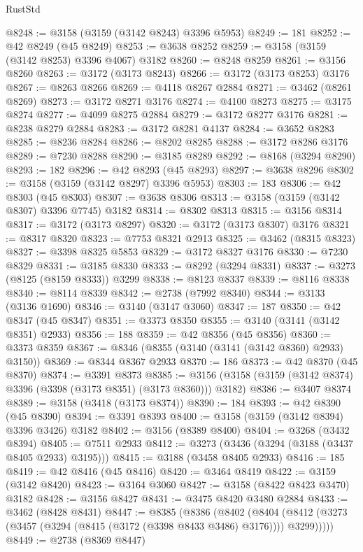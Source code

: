 \begin{lexlean}{RustStd}
\begin{coremodule}
@8248 := @3158 (@3159 (@3142 @8243) @3396 @5953)
@8249 := 181
@8252 := @42 @8249 (@45 @8249)
@8253 := @3638 @8252
@8259 := @3158 (@3159 (@3142 @8253) @3396 @4067) @3182
@8260 := @8248 @8259
@8261 := @3156 @8260
@8263 := @3172 (@3173 @8243)
@8266 := @3172 (@3173 @8253) @3176
@8267 := @8263 @8266
@8269 := @4118 @8267 @2884
@8271 := @3462 (@8261 @8269)
@8273 := @3172 @8271 @3176
@8274 := @4100 @8273
@8275 := @3175 @8274
@8277 := @4099 @8275 @2884
@8279 := @3172 @8277 @3176
@8281 := @8238 @8279 @2884
@8283 := @3172 @8281 @4137
@8284 := @3652 @8283
@8285 := @8236 @8284
@8286 := @8202 @8285
@8288 := @3172 @8286 @3176
@8289 := @7230 @8288
@8290 := @3185 @8289
@8292 := @8168 (@3294 @8290)
@8293 := 182
@8296 := @42 @8293 (@45 @8293)
@8297 := @3638 @8296
@8302 := @3158 (@3159 (@3142 @8297) @3396 @5953)
@8303 := 183
@8306 := @42 @8303 (@45 @8303)
@8307 := @3638 @8306
@8313 := @3158 (@3159 (@3142 @8307) @3396 @7745) @3182
@8314 := @8302 @8313
@8315 := @3156 @8314
@8317 := @3172 (@3173 @8297)
@8320 := @3172 (@3173 @8307) @3176
@8321 := @8317 @8320
@8323 := @7753 @8321 @2913
@8325 := @3462 (@8315 @8323)
@8327 := @3398 @8325 @5853
@8329 := @3172 @8327 @3176
@8330 := @7230 @8329
@8331 := @3185 @8330
@8333 := @8292 (@3294 @8331)
@8337 := @3273 (@8125 (@8159 @8333)) @3299
@8338 := @8123 @8337
@8339 := @8116 @8338
@8340 := @8114 @8339
@8342 := @2738 (@7992 @8340)
@8344 := @3133 (@3136 @1690)
@8346 := @3140 (@3147 @3060)
@8347 := 187
@8350 := @42 @8347 (@45 @8347)
@8351 := @3373 @8350
@8355 := @3140 (@3141 (@3142 @8351) @2933)
@8356 := 188
@8359 := @42 @8356 (@45 @8356)
@8360 := @3373 @8359
@8367 := @8346 (@8355 (@3140 (@3141 (@3142 @8360) @2933) @3150))
@8369 := @8344 @8367 @2933
@8370 := 186
@8373 := @42 @8370 (@45 @8370)
@8374 := @3391 @8373
@8385 := @3156 (@3158 (@3159 (@3142 @8374) @3396 (@3398 (@3173 @8351) (@3173 @8360))) @3182)
@8386 := @3407 @8374
@8389 := @3158 (@3418 (@3173 @8374))
@8390 := 184
@8393 := @42 @8390 (@45 @8390)
@8394 := @3391 @8393
@8400 := @3158 (@3159 (@3142 @8394) @3396 @3426) @3182
@8402 := @3156 (@8389 @8400)
@8404 := @3268 (@3432 @8394)
@8405 := @7511 @2933
@8412 := @3273 (@3436 (@3294 (@3188 (@3437 @8405 @2933) @3195)))
@8415 := @3188 (@3458 @8405 @2933)
@8416 := 185
@8419 := @42 @8416 (@45 @8416)
@8420 := @3464 @8419
@8422 := @3159 (@3142 @8420)
@8423 := @3164 @3060
@8427 := @3158 (@8422 @8423 @3470) @3182
@8428 := @3156 @8427
@8431 := @3475 @8420 @3480 @2884
@8433 := @3462 (@8428 @8431)
@8447 := @8385
    (@8386
      (@8402
        (@8404 (@8412 (@3273 (@3457 (@3294 (@8415 (@3172 (@3398 @8433 @3486) @3176)))) @3299)))))
@8449 := @2738 (@8369 @8447)

\end{coremodule}
\end{lexlean}
